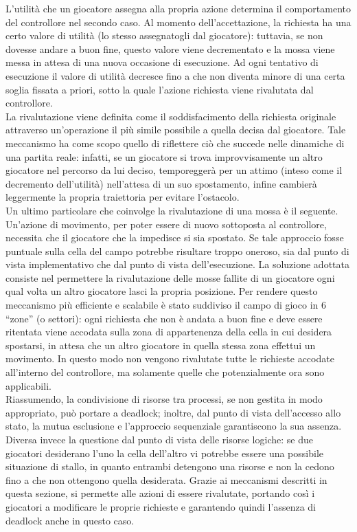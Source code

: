 L'utilità che un giocatore assegna alla propria azione determina il comportamento del controllore nel secondo caso. Al momento dell'accettazione, la richiesta ha una certo valore di utilità (lo stesso assegnatogli dal giocatore): tuttavia, se non dovesse andare a buon fine, questo valore viene decrementato e la mossa viene messa in attesa di una nuova occasione di esecuzione. Ad ogni tentativo di esecuzione il valore di utilità decresce fino a che non diventa minore di una certa soglia fissata a priori, sotto la quale l'azione richiesta viene rivalutata dal controllore.\\

La rivalutazione viene definita come il soddisfacimento della richiesta originale attraverso un'operazione il più simile possibile a quella decisa dal giocatore. Tale meccanismo ha come scopo quello di riflettere ciò che succede nelle dinamiche di una partita reale: infatti, se un giocatore si trova improvvisamente un altro giocatore nel percorso da lui deciso, temporeggerà per un attimo (inteso come il decremento dell'utilità) nell'attesa di un suo spostamento, infine cambierà leggermente la propria traiettoria per evitare l'ostacolo.\\

Un ultimo particolare che coinvolge la rivalutazione di una mossa è il seguente. Un'azione di movimento, per poter essere di nuovo sottoposta al controllore, necessita che il giocatore che la impedisce si sia spostato. Se tale approccio fosse puntuale sulla cella del campo potrebbe risultare troppo oneroso, sia dal punto di vista implementativo che dal punto di vista dell'esecuzione. La soluzione adottata consiste nel permettere la rivalutazione delle mosse fallite di un giocatore ogni qual volta un altro giocatore lasci la propria posizione. Per rendere questo meccanismo più efficiente e scalabile è stato suddiviso il campo di gioco in 6 ``zone'' (o settori): ogni richiesta che non è andata a buon fine e deve essere ritentata viene accodata sulla zona di appartenenza della cella in cui desidera spostarsi, in attesa che un altro giocatore in quella stessa zona effettui un movimento. In questo modo non vengono rivalutate tutte le richieste accodate all'interno del controllore, ma solamente quelle che potenzialmente ora sono applicabili.\\

Riassumendo, la condivisione di risorse tra processi, se non gestita in modo appropriato, può portare a deadlock; inoltre, dal punto di vista dell'accesso allo stato, la mutua esclusione e l'approccio sequenziale garantiscono la sua assenza. Diversa invece la questione dal punto di vista delle risorse logiche: se due giocatori desiderano l'uno la cella dell'altro vi potrebbe essere una possibile situazione di stallo, in quanto entrambi detengono una risorse e non la cedono fino a che non ottengono quella desiderata. Grazie ai meccanismi descritti in questa sezione, si permette alle azioni di essere rivalutate, portando così i giocatori a modificare le proprie richieste e garantendo quindi l'assenza di deadlock anche in questo caso.

